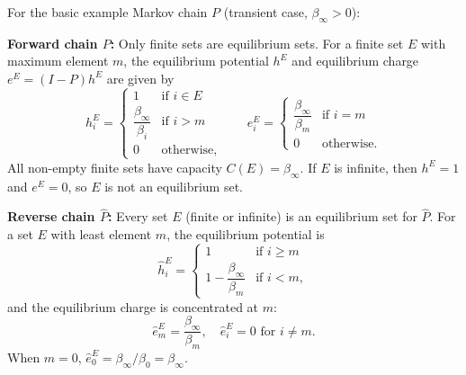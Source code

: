 For the basic example Markov chain $P$ (transient case, $\beta_\infty > 0$):

\textbf{Forward chain $P$:} Only finite sets are equilibrium sets. For a finite set $E$ with maximum element $m$, the equilibrium potential $h^E$ and equilibrium charge $e^E = (I-P)h^E$ are given by
$$h_i^E = \begin{cases} 1 & \text{if } i \in E \\ \dfrac{\beta_\infty}{\beta_i} & \text{if } i > m \\ 0 & \text{otherwise,} \end{cases} \qquad e_i^E = \begin{cases} \dfrac{\beta_\infty}{\beta_m} & \text{if } i = m \\ 0 & \text{otherwise.} \end{cases}$$
All non-empty finite sets have capacity $C(E) = \beta_\infty$. If $E$ is infinite, then $h^E = 1$ and $e^E = 0$, so $E$ is not an equilibrium set.

\textbf{Reverse chain $\hat{P}$:} Every set $E$ (finite or infinite) is an equilibrium set for $\hat{P}$. For a set $E$ with least element $m$, the equilibrium potential is
$$\hat{h}_i^E = \begin{cases} 1 & \text{if } i \geq m \\ 1 - \dfrac{\beta_\infty}{\beta_m} & \text{if } i < m, \end{cases}$$
and the equilibrium charge is concentrated at $m$:
$$\hat{e}_m^E = \frac{\beta_\infty}{\beta_m}, \quad \hat{e}_i^E = 0 \text{ for } i \neq m.$$
When $m = 0$, $\hat{e}_0^E = \beta_\infty / \beta_0 = \beta_\infty$.
